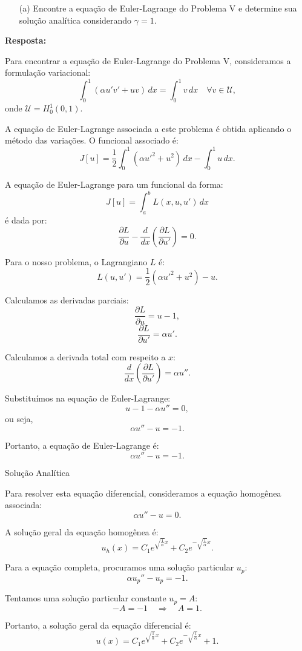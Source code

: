 \documentclass{article}
\begin{document}
\begin{itemize}
    \item[(a)] Encontre a equação de Euler-Lagrange do Problema V e determine sua solução analítica considerando \(\gamma = 1\).
\end{itemize}

\textbf{Resposta:}

Para encontrar a equação de Euler-Lagrange do Problema V, consideramos a formulação variacional:
\[
\int_0^1 (\alpha u'v' + u v) \, dx = \int_0^1 v \, dx \quad \forall v \in \mathcal{U},
\]
onde \(\mathcal{U} = H^1_0(0,1)\).

A equação de Euler-Lagrange associada a este problema é obtida aplicando o método das variações. O funcional associado é:
\[
J[u] = \frac{1}{2} \int_0^1 (\alpha u'^2 + u^2) \, dx - \int_0^1 u \, dx.
\]

A equação de Euler-Lagrange para um funcional da forma:
\[
J[u] = \int_a^b L(x, u, u') \, dx
\]
é dada por:
\[
\frac{\partial L}{\partial u} - \frac{d}{dx} \left( \frac{\partial L}{\partial u'} \right) = 0.
\]

Para o nosso problema, o Lagrangiano \( L \) é:
\[
L(u, u') = \frac{1}{2} (\alpha u'^2 + u^2) - u.
\]

Calculamos as derivadas parciais:
\[
\frac{\partial L}{\partial u} = u - 1,
\]
\[
\frac{\partial L}{\partial u'} = \alpha u'.
\]

Calculamos a derivada total com respeito a \(x\):
\[
\frac{d}{dx} \left( \frac{\partial L}{\partial u'} \right) = \alpha u''.
\]

Substituímos na equação de Euler-Lagrange:
\[
u - 1 - \alpha u'' = 0,
\]
ou seja,
\[
\alpha u'' - u = -1.
\]

Portanto, a equação de Euler-Lagrange é:
\[
\alpha u'' - u = -1.
\]

 Solução Analítica

Para resolver esta equação diferencial, consideramos a equação homogênea associada:
\[
\alpha u'' - u = 0.
\]

A solução geral da equação homogênea é:
\[
u_h(x) = C_1 e^{\sqrt{\frac{1}{\alpha}} x} + C_2 e^{-\sqrt{\frac{1}{\alpha}} x}.
\]

Para a equação completa, procuramos uma solução particular \( u_p \):
\[
\alpha u_p'' - u_p = -1.
\]

Tentamos uma solução particular constante \( u_p = A \):
\[
-A = -1 \quad \Rightarrow \quad A = 1.
\]

Portanto, a solução geral da equação diferencial é:
\[
u(x) = C_1 e^{\sqrt{\frac{1}{\alpha}} x} + C_2 e^{-\sqrt{\frac{1}{\alpha}} x} + 1.
\]
\end{document}
